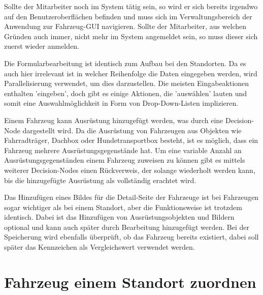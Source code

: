 Sollte der Mitarbeiter noch im System tätig sein, so wird er sich bereits irgendwo auf den Benutzeroberflächen befinden und muss sich im Verwaltungsbereich der Anwendung zur Fahrzeug-GUI navigieren. Sollte der Mitarbeiter, aus welchen Gründen auch immer, nicht mehr im System angemeldet sein, so muss dieser sich zuerst wieder anmelden. 


Die Formularbearbeitung ist identisch zum Aufbau bei den Standorten. Da es auch hier irrelevant ist in welcher Reihenfolge die Daten eingegeben werden, wird Parallelisierung verwendet, um dies darzustellen. Die meisten Eingabeaktionen enthalten 'eingeben', doch gibt es einige Aktionen, die 'auswählen' lauten und somit eine Auswahlmöglichkeit in Form von Drop-Down-Listen implizieren.


Einem Fahrzeug kann Ausrüstung hinzugefügt werden, was durch eine Decision-Node dargestellt wird. Da die Ausrüstung von Fahrzeugen aus Objekten wie Fahrradträger, Dachbox oder Hundetransportbox besteht, ist es möglich, dass ein Fahrzeug mehrere Ausrüstungsgegenstände hat. Um eine variable Anzahl an Ausrüstungsgegenständen einem Fahrzeug zuweisen zu können gibt es mittels weiterer Decision-Nodes einen Rückverweis, der solange wiederholt werden kann, bis die hinzugefügte Ausrüstung als vollständig erachtet wird. 


Das Hinzufügen eines Bildes für die Detail-Seite der Fahrzeuge ist bei Fahrzeugen sogar wichtiger als bei einem Standort, aber die Funktionsweise ist trotzdem identisch. Dabei ist das Hinzufügen von Ausrüstungsobjekten und Bildern optional und kann auch später durch Bearbeitung hinzugefügt werden. Bei der Speicherung wird ebenfalls überprüft, ob das Fahrzeug bereits existiert, dabei soll später das Kennzeichen als Vergleichswert verwendet werden. 

\newpage

\section{Fahrzeug einem Standort zuordnen}

